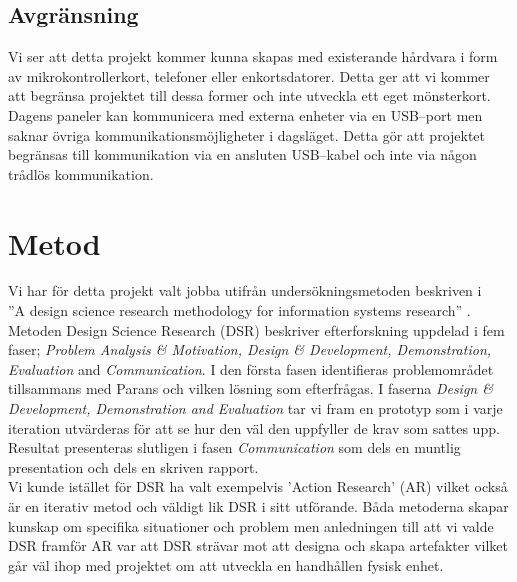 \documentclass{article}
\begin{document}

        \subsection{Avgränsning} %
        \label{sub:avgransning}
            Vi ser att detta projekt kommer kunna skapas med existerande hårdvara i form av mikrokontrollerkort, telefoner eller enkortsdatorer. Detta ger att vi kommer att begränsa projektet till dessa former och inte utveckla ett eget mönsterkort.\\

            \noindent Dagens paneler kan kommunicera med externa enheter via en USB--port men saknar övriga kommunikationsmöjligheter i dagsläget. Detta gör att projektet begränsas till kommunikation via en ansluten USB--kabel och inte via någon trådlös kommunikation.

    \section{Metod} %
    \label{sec:metod}

        Vi har för detta projekt valt jobba utifrån undersökningsmetoden beskriven i \\
        ''A design science research methodology for information systems research'' \cite{method}. \\

        \noindent Metoden Design Science Research (DSR) beskriver efterforskning uppdelad i fem faser;
        \textit{Problem Analysis \& Motivation, Design \& Development, Demonstration, Evaluation} and \textit{Communication}. 
        I den första fasen identifieras problemområdet tillsammans med Parans och vilken lösning som efterfrågas. I faserna \textit{Design \& Development, Demonstration and Evaluation} tar vi fram en prototyp som i varje iteration utvärderas för att se hur den väl den uppfyller de krav som sattes upp.
        Resultat presenteras slutligen i fasen \textit{Communication} som dels en muntlig presentation och dels en skriven rapport. \\

        \noindent Vi kunde istället för DSR ha valt exempelvis 'Action Research' (AR) vilket också är en iterativ metod och väldigt lik DSR i sitt utförande. Båda metoderna skapar kunskap om specifika situationer och problem men anledningen till att vi valde DSR framför AR var att DSR strävar mot att designa och skapa artefakter vilket går väl ihop med projektet om att utveckla en handhållen fysisk enhet. \cite {designscience} \\
\end{document}
